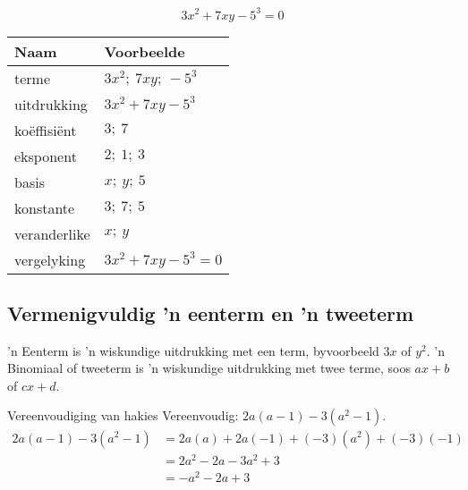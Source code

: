 \begin{equation*}
3x^2 + 7xy -5^3 = 0
\end{equation*}


\begin{table}[H]
\begin{center}
\begin{tabular}{|l|l|}
\hline
\textbf{Naam} & \textbf{Voorbeelde} \\
\hline
terme & $3x^2;~7xy;~-5^3$\\ \hline
uitdrukking & $3x^2 + 7xy -5^3$\\ \hline
koëffisiënt & $3;~7$\\ \hline
eksponent & $2;~1;~3$\\ \hline
basis & $x;~y;~5$\\ \hline
konstante & $3;~7;~5$\\ \hline
veranderlike & $x;~y$\\ \hline
vergelyking & $3x^2 + 7xy -5^3 = 0$\\ \hline


\end{tabular}
\end{center}
\end{table} 

\par

\subsection*{Vermenigvuldig 'n eenterm en 'n tweeterm}
’n Eenterm is ’n wiskundige uitdrukking met een term, byvoorbeeld $3x$ of $y^2$. ’n Binomiaal of tweeterm is ’n wiskundige uitdrukking met twee terme, soos $ax+b$ of $cx+d$.
\vspace*{-10pt}
\begin{wex}{Vereenvoudiging van hakies}
{Vereenvoudig: $2a(a-1) - 3(a^{2}-1)$. \vspace*{-10pt}}
{\vspace*{-10pt}
\begin{align*}
  2a(a-1) -3(a^{2}-1) &= 2a(a) + 2a(-1) + (-3)(a^{2})+(-3)(-1) \\
  &= 2a^{2} - 2a - 3a^{2} + 3 \\
  &= -a^{2} -2a + 3
\end{align*}
\vspace*{-15pt}
}
\end{wex}

